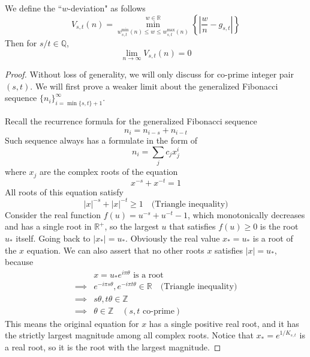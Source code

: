 \documentclass[]{article}
\begin{document}
\vspace{1cm}
\begin{lemma}[$w$ limit]
	We define the ``$w$-deviation" as follows
	\[
		V_{s,t}(n) = \min_{w_{s,t}^{\min}(n)\le w \le w_{s,t}^{\max}(n)}^{w\in\mathbb{R}} \left\{ \left|\frac{w}{n} - g_{s,t}\right| \right\}
	\]
	Then for $s/t\in\mathbb{Q}$, 
	\[
	\lim_{n\to\infty} V_{s,t}(n) = 0
	\]
\end{lemma}
\begin{proof}
	Without loss of generality, we will only discuss for co-prime integer pair $(s, t)$. We will first prove a weaker limit about the generalized Fibonacci sequence $\{n_i\}_{i=\min\{s,t\}+1}^{\infty}$.
	
	Recall the recurrence formula for the generalized Fibonacci sequence 
	\[
	n_i = n_{i-s} + n_{i-t}
	\]
	Such sequence always has a formulate in the form of
	\[
	n_i = \sum_{j} c_j x^i_j
	\]
	where $x_j$ are the complex roots of the equation
	\[
	x^{-s} + x^{-t} = 1
	\]
	All roots of this equation satisfy
	\[
	|x|^{-s} + |x|^{-t} \ge 1 \quad \text{(Triangle inequality)}
	\]
	Consider the real function $f(u) = u^{-s} + u^{-t} - 1$, which monotonically decreases and has a single root in $\mathbb{R}^+$, so the largest $u$ that satisfies $f(u)\ge 0$ is the root $u_*$ itself. Going back to $|x_*| = u_*$. Obviously the real value $x_* = u_*$ is a root of the $x$ equation. We can also assert that no other roots $x$ satisfies $|x| = u_*$, because
	\begin{align*}
	&x = u_*e^{i\pi\theta} \text{ is a root} \\
	\implies& e^{-i\pi s\theta}, e^{-i\pi t\theta} \in \mathbb{R} \quad \text{(Triangle inequality)} \\
	\implies& s\theta, t\theta \in \mathbb{Z} \\
	\implies& \theta \in \mathbb{Z} \quad (s, t \text{ co-prime})
	\end{align*}
	This means the original equation for $x$ has a single positive real root, and it has the strictly largest magnitude among all complex roots. Notice that $x_* = e^{1/K_{s,t}}$ is a real root, so it is the root with the largest magnitude. 
	

\end{proof}
\end{document}
